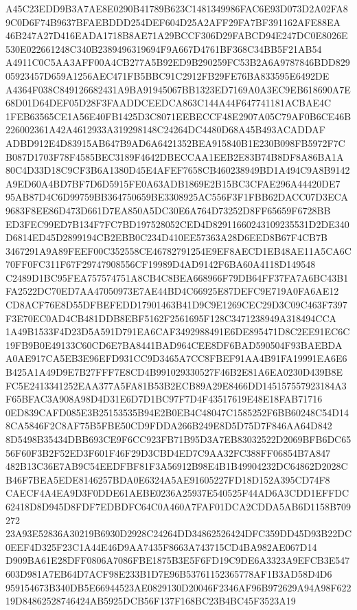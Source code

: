 \documentclass[UTF8,fontset=fandol,zihao=-4,a4paper]{ctexart}
\begin{document}
{{A45C23EDD9B3A7AE8E0290B41789B623C1481349986FAC6E93D073D2A02FA89C0D6F74B9637BFAEBDDD254DEF604D25A2AFF29FA7BF391162AFE88EA
46B247A27D416EADA1718B8AE71A29BCCF306D29FABCD94E247DC0E8026E530E022661248C340B2389496319694F9A667D4761BF368C34BB5F21AB54
A4911C0C5AA3AFF00A4CB277A5B92ED9B290259FC53B2A6A9787846BDD82905923457D659A1256AEC471FB5BBC91C2912FB29FE76BA833595E6492DE
A4364F038C849126682431A9BA91945067BB1323ED7169A0A3EC9EB618690A7E68D01D64DEF05D28F3FAADDCEEDCA863C144A44F647741181ACBAE4C
1FEB63565CE1A56E40FB1425D3C8071EEBECCF48E2907A05C79AF0B6CE46B226002361A42A4612933A319298148C24264DC4480D68A45B493ACADDAF
ADBD912E4D83915AB647B9AD6A6421352BEA915840B1E230B098FB5972F7CB087D1703F78F4585BEC3189F4642DBECCAA1EEB2E83B74B8DF8A86BA1A
80C4D33D18C9CF3B6A1380D45E4AFEF7658CB460238949BD1A494C9A8B9142A9ED60A4BD7BF7D6D5915FE0A63ADB1869E2B15BC3CFAE296A44420DE7
95AB87D4C6D99759BB364750659BE3308925AC556F3F1FBB62DACC07D3ECA9683F8EE86D473D661D7EA850A5DC30E6A764D73252D8FF65659F6728BB
ED3FEC99ED7B134F7FC7BD197528052CED4D82911660243109235531D2DE340D6814ED45D2899194CB2EBB0C234D410EE57363A28D6EED8B67F4CB7B
3467291A9A89FEEF00C352558CE46782791254E9EF8AECD1EB48AE11A5CA6C70FF0FC311F67F29747908556CF19989D4AD9142F6BA60A4118D149548
C2489D1BC95FEA757574751A8CB4C8BEA668966F79DB64FF37FA7A6BC43B1FA2522DC70ED7AA47050973E7AE44BD4C66925E87DEFC9E719A0FA6AE12
CD8ACF76E8D55DFBEFEDD17901463B41D9C9E1269CEC29D3C09C463F7397F3E70EC0AD4CB481DDB8EBF5162F2561695F128C3471238949A318494CCA
1A49B1533F4D23D5A591D791EA6CAF3492988491E6DE895471D8C2EE91EC6C19FB9B0E49133C60CD6E7BA8441BAD964CEE8DF6BAD590504F93BAEBDA
A0AE917CA5EB3E96EFD931CC9D3465A7CC8FBEF91AA4B91FA19991EA6E6B425A1A49D9E7B27FFF7E8CD4B991029330527F46B2E81A6EA0230D439B8E
FC5E2413341252EAA377A5FA81B53B2ECB89A29E8466DD145157557923184A3F65BFAC3A908A98D4D31E6D7D1BC97F7D4F43517619E48E18FAB71716
0ED839CAFD085E3B25153535B94E2B0EB4C48047C1585252F6BB60248C54D148CA5846F2C8AF75B5FBE50CD9FDDA266B249E8D5D75D7F846AA64D842
8D5498B35434DBB693CE9F6CC923FB71B95D3A7EB83032522D2069BFB6DC6556F60F3B2F52ED3F601F46F29D3CBD4ED7C9AA32FC388FF06854B7A847
482B13C36E7AB9C54EEDFBF81F3A56912B98E4B1B49904232DC64862D2028CB46F7BEA5EDE8146257BDA0E6324A5AE91605227FD18D152A395CD74F8
CAECF4A4EA9D3F0DDE61AEBE0236A25937E540525F44AD6A3CDD1EFFDC62418D8D945D8FDF7EDBDFC64C0A460A7FAF01DCA2CDDA5AB6D1158B709272
23A93E52836A30219B6930D2928C24264DD34862526424DFC359DD45D93B22DC0EEF4D325F23C1A44E46D9AA7435F8663A743715CD4BA982AE067D14
D909BA61E28DFF0806A7086FBE1875B3E5F6FD19C9DE6A3323A9EFCB3E547603D981A7EB64D7ACF98E233B1D7E96B53761152365778AF1B3AD58D4D6
959154673B340DB5E66944523AE0829130D20046F2346AF96B972629A94A98F62219D84862528746424AB5925DCB56F137F168BC23B4BC45F3523A19
}}
\end{document}
